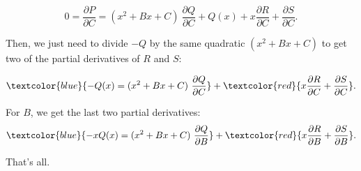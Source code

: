 \documentclass[11pt]{amsart}
\begin{document}
$$0 = \frac{\partial P}{\partial C}= (x^2+Bx+C)\ \frac{\partial
Q}{\partial C}+ Q(x) +x \frac{\partial R}{\partial C}+\frac{\partial
S}{\partial C}. $$

Then, we just need to divide $-Q$ by the same quadratic $(x^2+Bx+C)$
to get two of the
partial derivatives of $R$ and $S$:

$$\textcolor{blue}{-Q(x)=(x^2+Bx+C)\ \frac{\partial Q}{\partial C}}+\textcolor{red}{x \frac{\partial R}{\partial C}+\frac{\partial
S}{\partial C}} .$$

For $B$, we get the last two  partial derivatives:
$$\textcolor{blue}{-xQ(x)=(x^2+Bx+C)\ \frac{\partial Q}{\partial B}}+
\textcolor{red}{x \frac{\partial R}{\partial B}+\frac{\partial
S}{\partial B} }.$$

That's all.


  
\end{document}
